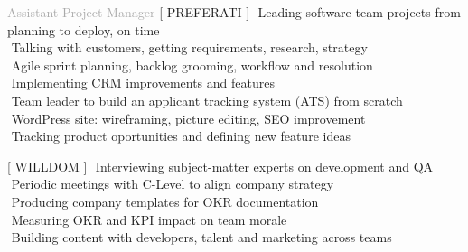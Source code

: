 
\begin{cvtable}

\bigskip

{\textcolor{darkgray}{Assistant Project Manager}}%
{[ {P\scriptsize REFERATI} ]}%
{%
     \textperiodcentered $ $ Leading software team projects from planning to deploy, on time \\
     \textperiodcentered $ $ %
     Talking with customers, 
     getting requirements, research, strategy \\
     \textperiodcentered $ $ Agile sprint planning, backlog grooming, workflow and resolution \\
     \textperiodcentered $ $ Implementing CRM improvements and features \\
     \textperiodcentered $ $ Team leader to build an applicant tracking system (ATS) from scratch \\
     \textperiodcentered $ $ WordPress site: wireframing, picture editing, SEO improvement \\
     \textperiodcentered $ $ Tracking product oportunities and defining new feature ideas %
} %
 
\bigskip
 
{\textcolor{darkgray}{}}%
{[ {W\scriptsize ILL}{D\scriptsize OM} ]}%
{%
    \textperiodcentered $ $ Interviewing subject-matter experts on development and QA \\
    \textperiodcentered $ $ Periodic meetings with C-Level to align company strategy  \\
    \textperiodcentered $ $ Producing company templates for OKR documentation \\
    \textperiodcentered $ $ Measuring OKR and KPI impact on team morale \\
    \textperiodcentered $ $ Building content with developers, talent and marketing across teams \\
} 


\end{cvtable}
